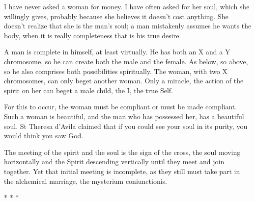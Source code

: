 I have never asked a woman for money. I have often asked for her soul, which she willingly gives, probably because she believes it doesn't cost anything. She doesn't realize that she is the man's soul; a man mistakenly assumes he wants the body, when it is really completeness that is his true desire.

A man is complete in himself, at least virtually. He has both an X and a Y chromosome, so he can create both the male and the female. As below, so above, so he also comprises both possibilities spiritually. The woman, with two X chromosomes, can only beget another woman. Only a miracle, the action of the spirit on her can beget a male child, the I, the true Self.

For this to occur, the woman must be compliant or must be made compliant. Such a woman is beautiful, and the man who has possessed her, has a beautiful soul. St Theresa d'Avila claimed that if you could see your soul in its purity, you would think you saw God.

The meeting of the spirit and the soul is the sign of the cross, the soul moving horizontally and the Spirit descending vertically until they meet and join together. Yet that initial meeting is incomplete, as they still must take part in the alchemical marriage, the mysterium coniunctionis.




\begin{center}* * *\end{center}

